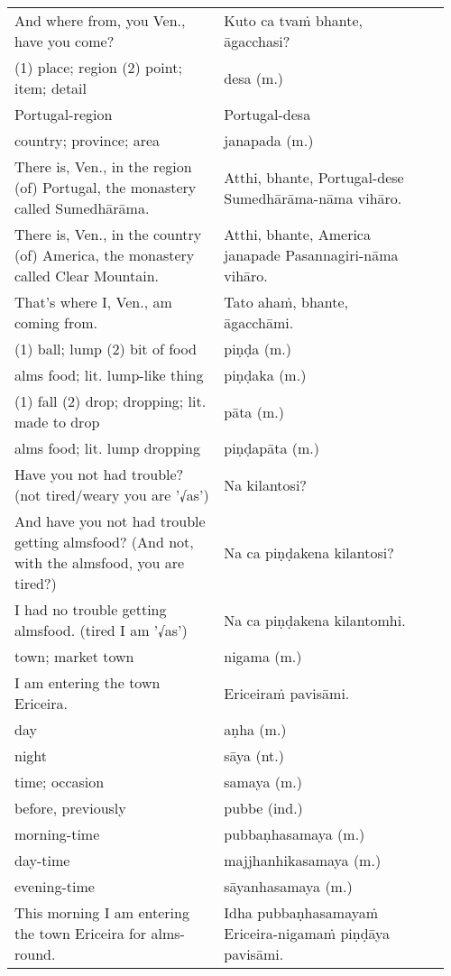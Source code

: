 \documentclass[a5paper]{memoir}
\begin{document}
\begin{longtable}{L{0.48\linewidth} L{0.48\linewidth} H}
And where from, you Ven., have you come? & Kuto ca tvaṁ bhante, āgacchasi? & \\[0pt]
(1) place; region (2) point; item; detail & desa (m.) & \\[0pt]
Portugal-region & Portugal-desa & \\[0pt]
country; province; area & janapada (m.) & \\[0pt]
There is, Ven., in the region (of) Portugal, the monastery called Sumedhārāma. & Atthi, bhante, Portugal-dese Sumedhārāma-nāma vihāro. & \\[0pt]
There is, Ven., in the country (of) America, the monastery called Clear Mountain. & Atthi, bhante, America janapade Pasannagiri-nāma vihāro. & \\[0pt]
That's where I, Ven., am coming from. & Tato ahaṁ, bhante, āgacchāmi. & \\[0pt]
(1) ball; lump (2) bit of food & piṇḍa (m.) & \\[0pt]
alms food; lit. lump-like thing & piṇḍaka (m.) & \\[0pt]
(1) fall (2) drop; dropping; lit. made to drop & pāta (m.) & \\[0pt]
alms food; lit. lump dropping & piṇḍapāta (m.) & \\[0pt]
Have you not had trouble? (not tired/weary you are '√as') & Na kilantosi? & \\[0pt]
And have you not had trouble getting almsfood? (And not, with the almsfood, you are tired?) & Na ca piṇḍakena kilantosi? & \\[0pt]
I had no trouble getting almsfood. (tired I am '√as') & Na ca piṇḍakena kilantomhi. & \\[0pt]
town; market town & nigama (m.) & \\[0pt]
I am entering the town Ericeira. & Ericeiraṁ pavisāmi. & \\[0pt]
day & aṇha (m.) & \\[0pt]
night & sāya (nt.) & \\[0pt]
time; occasion & samaya (m.) & \\[0pt]
before, previously & pubbe (ind.) & \\[0pt]
morning-time & pubbaṇhasamaya (m.) & \\[0pt]
day-time & majjhanhikasamaya (m.) & \\[0pt]
evening-time & sāyanhasamaya (m.) & \\[0pt]
This morning I am entering the town Ericeira for alms-round. & Idha pubbaṇhasamayaṁ Ericeira-nigamaṁ piṇḍāya pavisāmi. & \\[0pt]

\end{longtable}
\end{document}

